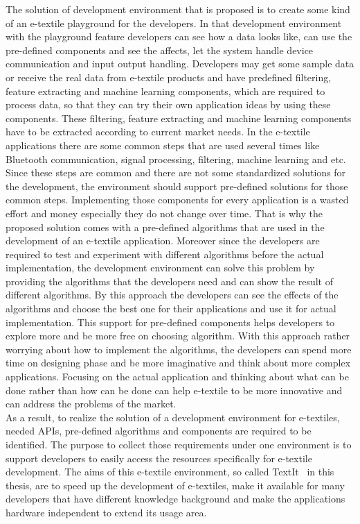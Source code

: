 The solution of development environment that is proposed is to create some kind of an e-textile playground for the developers. In that development environment with the playground feature developers can see how a data looks like, can use the pre-defined components and see the affects, let the system handle device communication and input output handling. Developers may get some sample data or receive the real data from e-textile products and have predefined filtering, feature extracting and machine learning components, which are required to process data, so that they can try their own application ideas by using these components. These filtering, feature extracting and machine learning components have to be extracted according to current market needs. In the e-textile applications there are some common steps that are used several times like Bluetooth communication, signal processing, filtering, machine learning and etc. Since these steps are common and there are not some standardized solutions for the development, the environment should support pre-defined solutions for those common steps. Implementing those components for every application is a wasted effort and money especially they do not change over time. That is why the proposed solution comes with a pre-defined algorithms that are used in the development of an e-textile application. Moreover since the developers are required to test and experiment with different algorithms before the actual implementation, the development environment can solve this problem by providing the algorithms that the developers need and can show the result of different algorithms. By this approach the developers can see the effects of the algorithms and choose the best one for their applications and use it for actual implementation. This support for pre-defined components helps developers to explore more and be more free on choosing algorithm. With this approach rather worrying about how to implement the algorithms, the developers can spend more time on designing phase and be more imaginative and think about more complex applications. Focusing on the actual application and thinking about what can be done rather than how can be done can help e-textile to be more innovative and can address the problems of the market. \\

As a result, to realize the solution of a development environment for e-textiles, needed APIs, pre-defined algorithms and components are required to be identified. The purpose to collect those requirements under one environment is to support developers to easily access the resources specifically for e-textile development. The aims of this e-textile environment, so called TextIt \ in this thesis, are to speed up the development of e-textiles, make it available for many developers that have different knowledge background and make the applications hardware independent to extend its usage area.
